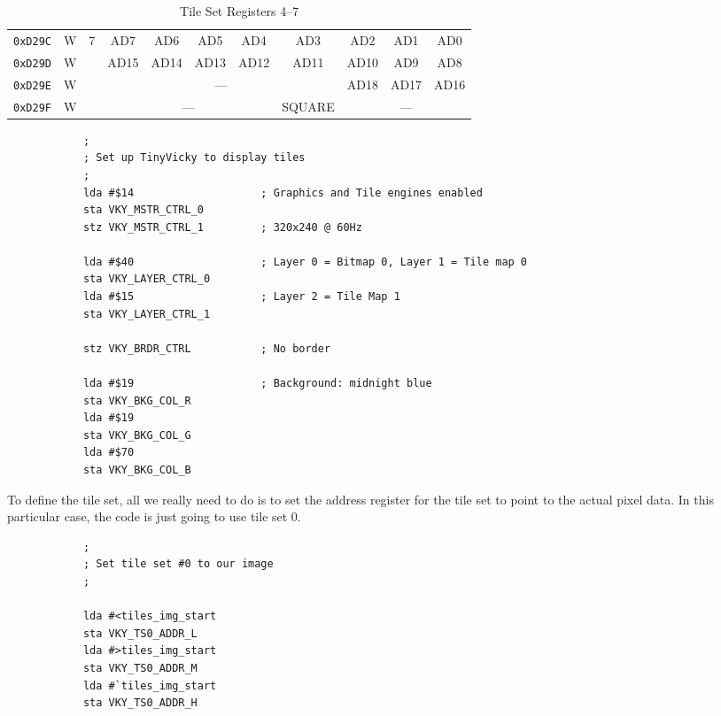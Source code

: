 \begin{table}[ht]
\begin{center}
\begin{tabular}{|c|c|c|c|c|c|c|c|c|c|c|}
            \verb+0xD29C+ & W & \multirow{4}{*}{7} & AD7 & AD6 & AD5 & AD4 & AD3 & AD2 & AD1 & AD0 \\ \cline{1-2}\cline{4-11}
            \verb+0xD29D+ & W &                    & AD15 & AD14 & AD13 & AD12 & AD11 & AD10 & AD9 & AD8 \\ \cline{1-2}\cline{4-11}
            \verb+0xD29E+ & W &                    & \multicolumn{5}{|c|}{---} & AD18 & AD17 & AD16 \\ \cline{1-2}\cline{4-11}
            \verb+0xD29F+ & W &                    & \multicolumn{4}{|c|}{---} & SQUARE & \multicolumn{3}{|c|}{---} \\ \hline
        \end{tabular}
    \end{center}
    \caption{Tile Set Registers 4--7}
    \label{tab:tile_set_addr_4_7}
\end{table}


\begin{verbatim}
            ;
            ; Set up TinyVicky to display tiles
            ;
            lda #$14                    ; Graphics and Tile engines enabled
            sta VKY_MSTR_CTRL_0
            stz VKY_MSTR_CTRL_1         ; 320x240 @ 60Hz

            lda #$40                    ; Layer 0 = Bitmap 0, Layer 1 = Tile map 0
            sta VKY_LAYER_CTRL_0
            lda #$15                    ; Layer 2 = Tile Map 1
            sta VKY_LAYER_CTRL_1

            stz VKY_BRDR_CTRL           ; No border

            lda #$19                    ; Background: midnight blue
            sta VKY_BKG_COL_R
            lda #$19
            sta VKY_BKG_COL_G
            lda #$70
            sta VKY_BKG_COL_B
\end{verbatim}

To define the tile set, all we really need to do is to set the address register for the tile set to point to the actual pixel data. In this particular case, the code is just going to use tile set 0.

\begin{verbatim}
            ;
            ; Set tile set #0 to our image
            ;

            lda #<tiles_img_start
            sta VKY_TS0_ADDR_L
            lda #>tiles_img_start
            sta VKY_TS0_ADDR_M
            lda #`tiles_img_start
            sta VKY_TS0_ADDR_H
\end{verbatim}

